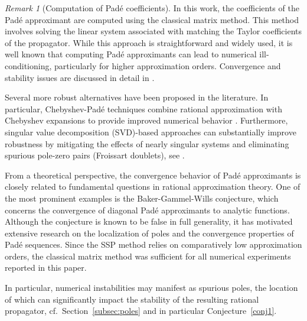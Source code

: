 \documentclass[11pt,a4paper]{article}
\theoremstyle{plain}%
\theoremstyle{definition}
\theoremstyle{remark}
\newtheorem*{remark}{Remark}
\begin{document}
\begin{remark}[Computation of Pad\'e coefficients]
\label{rem:pade_coeff}
In this work, the coefficients of the Pad\'e approximant are computed using the classical matrix method. 
This method involves solving the linear system associated with matching the Taylor coefficients of the propagator. 
While this approach is straightforward and widely used, it is well known that computing Pad\'e approximants 
can lead to numerical ill-conditioning, particularly for higher approximation orders. 
Convergence and stability issues are discussed in detail in \cite[Section~III]{Dronamraju2021}.

Several more robust alternatives have been proposed in the literature. 
In particular, Chebyshev-Pad\'e techniques combine rational approximation with Chebyshev expansions to provide improved numerical behavior \cite[Section~9.1.]{dedner2001transparent}.
Furthermore, singular value decomposition (SVD)-based approaches can substantially improve robustness by mitigating the effects of nearly singular systems and eliminating spurious pole-zero pairs (Froissart doublets), see \cite{gonnet2013robust}.

From a theoretical perspective, the convergence behavior of Pad\'e approximants is closely related to fundamental questions in rational approximation theory.
One of the most prominent examples is the Baker-Gammel-Wills conjecture, which concerns the convergence of diagonal Pad\'e approximants to analytic functions. 
Although the conjecture is known to be false in full generality, it has motivated extensive research on the localization of poles and the convergence properties of Pad\'e sequences. 
Since the %
SSP method relies on comparatively low approximation orders, the classical matrix method was sufficient for all numerical experiments reported in this paper.

In particular, numerical instabilities may manifest as spurious poles, the location of which can significantly impact the stability of the resulting rational propagator, cf.\ Section~\ref{subsec:poles} and in particular Conjecture~\ref{conj1}.
\end{remark}
\end{document}
